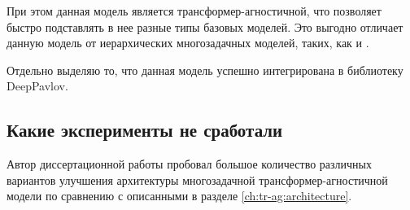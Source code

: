 При этом данная модель является трансформер-агностичной, что позволяет быстро подставлять в нее разные типы базовых моделей. Это выгодно отличает данную модель от иерархических многозадачных моделей, таких, как \cite{PAL:19} и \cite{TaskEmbedded2021}. 

Отдельно выделяю то, что данная модель успешно интегрирована в библиотеку DeepPavlov\cite{Burtsev2018DeepPavlovAO}.

\subsection{Какие эксперименты не сработали}\label{ch:tr-ag:failed_attempts} 
Автор диссертационной работы пробовал большое количество различных вариантов улучшения архитектуры многозадачной трансформер-агностичной модели по сравнению с описанными в разделе \ref{ch:tr-ag:architecture}. 
